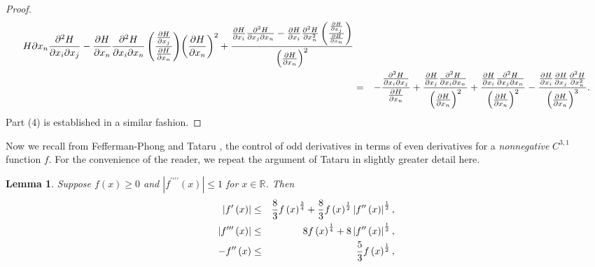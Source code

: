 \documentclass{amsart}
\theoremstyle{plain}
\newtheorem{lemma}[theorem]{Lemma}
\numberwithin{equation}{section}
\begin{document}
\begin{proof}
\begin{eqnarray*}
{{H}{\partial x_{n}}\frac{\partial ^{2}H}{\partial x_{i}\partial x_{j}}-\frac{%
\partial H}{\partial x_{n}}\frac{\partial ^{2}H}{\partial x_{i}\partial x_{n}%
}\left( \frac{\frac{\partial H}{\partial x_{j}}}{\frac{\partial H}{\partial
x_{n}}}\right) }{\left( \frac{\partial H}{\partial x_{n}}\right) ^{2}}+\frac{%
\frac{\partial H}{\partial x_{i}}\frac{\partial ^{2}H}{\partial
x_{j}\partial x_{n}}-\frac{\partial H}{\partial x_{i}}\frac{\partial ^{2}H}{%
\partial x_{n}^{2}}\left( \frac{\frac{\partial H}{\partial x_{j}}}{\frac{%
\partial H}{\partial x_{n}}}\right) }{\left( \frac{\partial H}{\partial x_{n}%
}\right) ^{2}} \\
&=&-\frac{\frac{\partial ^{2}H}{\partial x_{i}\partial x_{j}}}{\frac{%
\partial H}{\partial x_{n}}}+\frac{\frac{\partial H}{\partial x_{j}}\frac{%
\partial ^{2}H}{\partial x_{i}\partial x_{n}}}{\left( \frac{\partial H}{%
\partial x_{n}}\right) ^{2}}+\frac{\frac{\partial H}{\partial x_{i}}\frac{%
\partial ^{2}H}{\partial x_{j}\partial x_{n}}}{\left( \frac{\partial H}{%
\partial x_{n}}\right) ^{2}}-\frac{\frac{\partial H}{\partial x_{i}}\frac{%
\partial H}{\partial x_{j}}\frac{\partial ^{2}H}{\partial x_{n}^{2}}}{\left( 
\frac{\partial H}{\partial x_{n}}\right) ^{3}}.
\end{eqnarray*}%
Part (4) is established in a similar fashion.
\end{proof}

Now we recall from Fefferman-Phong \cite{FePh} and Tataru \cite[Lemma 5.1]%
{Tat}, the control of odd derivatives in terms of even derivatives for a 
\emph{nonnegative} $C^{3,1}$ function $f$. For the convenience of the
reader, we repeat the argument of Tataru \cite[Lemma 5.1]{Tat} in slightly
greater detail here.

\begin{lemma}
\label{first local}Suppose $f\left( x\right) \geq 0$ and $\left\vert
f^{\prime \prime \prime \prime }\left( x\right) \right\vert \leq 1$ for $%
x\in \mathbb{R}$. Then%
\begin{eqnarray}
\left\vert f^{\prime }\left( x\right) \right\vert &\leq &\frac{8}{3}f\left(
x\right) ^{\frac{3}{4}}+\frac{8}{3}f\left( x\right) ^{\frac{1}{2}}\left\vert
f^{\prime \prime }\left( x\right) \right\vert ^{\frac{1}{2}},  \label{nonneg}
\\
\left\vert f^{\prime \prime \prime }\left( x\right) \right\vert &\leq
&8f\left( x\right) ^{\frac{1}{4}}+8\left\vert f^{\prime \prime }\left(
x\right) \right\vert ^{\frac{1}{2}},  \notag \\
-f^{\prime \prime }\left( x\right) &\leq &\frac{5}{3}f\left( x\right) ^{%
\frac{1}{2}},  \notag
\end{eqnarray}
\end{lemma}
\end{document}
